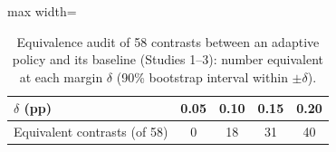 \begin{table}[t]
\caption{Equivalence audit of 58 contrasts between an adaptive policy and its baseline (Studies 1--3): number equivalent at each margin $\delta$ (90\% bootstrap interval within $\pm\delta$).}\label{tab:equiv}
\centering
\small
\begin{adjustbox}{max width=\linewidth}
\begin{tabular}{lcccc}
\toprule
$\delta$ (pp) & 0.05 & 0.10 & 0.15 & 0.20 \\
\midrule
Equivalent contrasts (of 58) & 0 & 18 & 31 & 40 \\
\bottomrule
\end{tabular}
\end{adjustbox}
\end{table}
